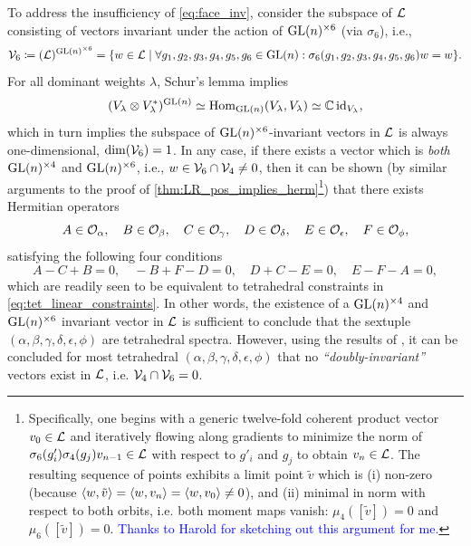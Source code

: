 \documentclass[notitlepage, 10pt]{article}
\begin{document}
\begin{rem}
    To address the insufficiency of \cref{eq:face_inv}, consider the subspace of $\mathcal L$ consisting of vectors invariant under the action of $\operatorname{GL}(n)^{\times 6}$ (via $\sigma_6$), i.e.,
    \begin{equation}
        \mathcal V_{6} \coloneqq (\mathcal L)^{\operatorname{GL}(n)^{\times 6}} = \{ w \in \mathcal L \mid \forall g_1, g_2, g_3, g_4,g_5,g_6 \in \operatorname{GL}(n) : \sigma_{6}(g_1, g_2, g_3, g_4, g_5, g_6) w = w \}.
    \end{equation}
    For all dominant weights $\lambda$, Schur's lemma implies
    \begin{equation}
        (V_{\lambda} \otimes V_{\lambda}^{*})^{\operatorname{GL}(n)} \simeq \operatorname{Hom}_{\operatorname{GL}(n)}(V_{\lambda}, V_{\lambda}) \simeq \mathbb C \operatorname{id}_{V_\lambda},
    \end{equation}
    which in turn implies the subspace of $\operatorname{GL}(n)^{\times 6}$-invariant vectors in $\mathcal L$ is always one-dimensional, $\dim (\mathcal V_{6}) = 1$.
    In any case, if there exists a vector which is \textit{both} $\operatorname{GL}(n)^{\times 4}$ and $\operatorname{GL}(n)^{\times 6}$, i.e., $w \in \mathcal V_{6} \cap \mathcal V_{4} \neq 0$, then it can be shown (by similar arguments to the proof of \cref{thm:LR_pos_implies_herm}\footnote{Specifically, one begins with a generic twelve-fold coherent product vector $v_0 \in \mathcal L$ and iteratively flowing along gradients to minimize the norm of $\sigma_{6}(g'_i)\sigma_{4}(g_j)v_{n-1} \in \mathcal L$ with respect to $g'_i$ and $g_j$ to obtain $v_{n} \in \mathcal L$. The resulting sequence of points exhibits a limit point $\tilde v$ which is (i) non-zero (because $\braket{w, \tilde v} = \braket{w, v_n} = \braket{w, v_0} \neq 0$), and (ii) minimal in norm with respect to both orbits, i.e. both moment maps vanish: $\mu_4([\tilde v]) = 0$ and $\mu_{6}([\tilde v]) = 0$. \textcolor{blue}{Thanks to Harold for sketching out this argument for me.}}) that there exists Hermitian operators
    \begin{equation}
        A \in \mathcal O_{\alpha}, \quad
        B \in \mathcal O_{\beta}, \quad
        C \in \mathcal O_{\gamma}, \quad
        D \in \mathcal O_{\delta}, \quad
        E \in \mathcal O_{\epsilon}, \quad
        F \in \mathcal O_{\phi},
    \end{equation}
    satisfying the following four conditions
    \begin{equation}
        A - C + B = 0, \quad
        - B + F - D = 0, \quad
        D + C - E = 0, \quad
        E - F - A = 0,
    \end{equation}
    which are readily seen to be equivalent to tetrahedral constraints in \cref{eq:tet_linear_constraints}.
    In other words, the existence of a $\operatorname{GL}(n)^{\times 4}$ and $\operatorname{GL}(n)^{\times 6}$ invariant vector in $\mathcal L$ is sufficient to conclude that the sextuple $(\alpha,\beta,\gamma, \delta, \epsilon, \phi)$ are tetrahedral spectra.
    However, using the results of \cite{roberts1999classical}, it can be concluded for most tetrahedral $(\alpha, \beta, \gamma, \delta, \epsilon, \phi)$ that no \textit{``doubly-invariant''} vectors exist in $\mathcal L$, i.e. $\mathcal V_{4} \cap \mathcal V_{6} = 0$.
\end{rem}
\end{document}
